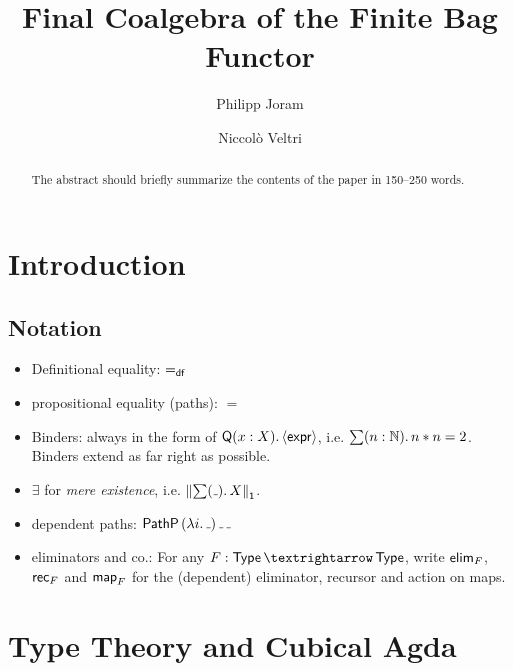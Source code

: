 \documentclass[runningheads]{llncs}
\begin{document}
\title{Final Coalgebra of the Finite Bag Functor}
\author{%
    Philipp Joram \and
    Niccolò Veltri%
}
%

\maketitle              %

\begin{abstract}
The abstract should briefly summarize the contents of the paper in
150--250 words.

\end{abstract}

\section{Introduction}

\subsection{Notation}
\begin{itemize}
  \item Definitional equality: $\mathbin{=_\mathsf{df}}$
  \item propositional equality (paths): $=$
  \item Binders: always in the form of $\mathsf{Q} (x : X)\mathpunct{.} \langle\mathsf{expr}\rangle$,
    i.e. $\sum (n : \mathbb{N})\mathpunct{.} n * n = 2$.
    Binders extend as far right as possible.
  \item $\exists$ for \emph{mere existence}, i.e. $\PropTrunc{\sum (\mathunderscore)\Where X}$.
  \item dependent paths: $\PathP{} (\lambda i\Where \mathunderscore)\, \mathunderscore\, \mathunderscore$
  \item eliminators and co.:
    For any $F : \Type → \Type$, write
    $\operatorname{\mathsf{elim}}_{F}$, $\operatorname{\mathsf{rec}}_{F}$ and $\operatorname{\mathsf{map}}_{F}$
    for the (dependent) eliminator, recursor and action on maps.
\end{itemize}

\section{Type Theory and Cubical Agda}
\end{document}
